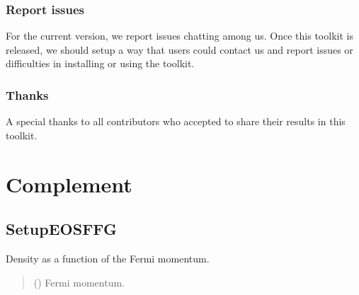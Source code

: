 \documentclass[letterpaper,10pt,english]{sphinxmanual}
\begin{document}
\subsection{Report issues}
\label{\detokenize{source/miscelaneous:report-issues}}\label{\detokenize{source/miscelaneous:id3}}
\sphinxAtStartPar
For the current version, we report issues chatting among us.
Once this toolkit is released, we should setup a way that users could contact us and report issues or difficulties in installing or using the toolkit.


\subsection{Thanks}
\label{\detokenize{source/miscelaneous:thanks}}\label{\detokenize{source/miscelaneous:id4}}
\sphinxAtStartPar
A special thanks to all contributors who accepted to share their results in this toolkit.


\chapter{Complement}
\label{\detokenize{index:complement}}
\sphinxstepscope


\section{SetupEOSFFG}
\label{\detokenize{source/api/setup_eos_ffg:setupeosffg}}\label{\detokenize{source/api/setup_eos_ffg::doc}}\label{\detokenize{source/api/setup_eos_ffg:module-nucleardatapy.eos.setup_ffg}}

\begin{fulllineitems}
\label{\detokenize{source/api/setup_eos_ffg:nucleardatapy.eos.setup_ffg.den}}
\pysigstartsignatures
{}
\pysigstopsignatures
\sphinxAtStartPar
Density as a function of the Fermi momentum.
\begin{quote}\begin{description}
\sphinxAtStartPar
{} () \textendash{} Fermi momentum.

\end{description}\end{quote}

\end{fulllineitems}
\end{document}
